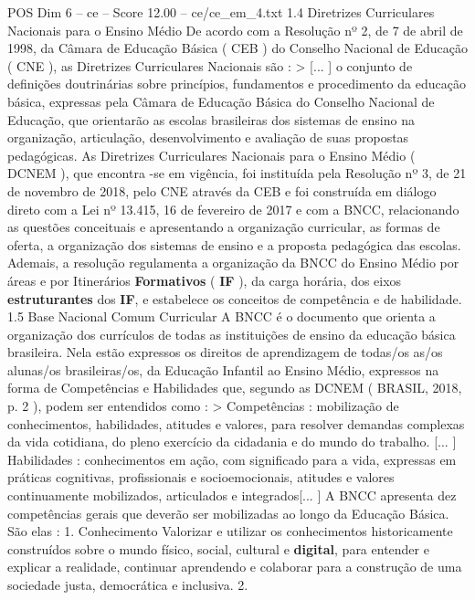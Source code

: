 \begin{textsample}{POS Dim 6 – ce – Score 12.00 – ce/ce\_em\_4.txt}  \label{ex:f6_pos_033}
1.4 Diretrizes Curriculares Nacionais para o Ensino Médio De acordo com a Resolução nº 2, de 7 de abril de 1998, da Câmara de Educação Básica ( CEB ) do Conselho Nacional de Educação ( CNE ), as Diretrizes Curriculares Nacionais são : > [... ] o conjunto de definições doutrinárias sobre princípios, fundamentos e procedimento da educação básica, expressas pela Câmara de Educação Básica do Conselho Nacional de Educação, que orientarão as escolas brasileiras dos sistemas de ensino na organização, articulação, desenvolvimento e avaliação de suas propostas pedagógicas.
As Diretrizes Curriculares Nacionais para o Ensino Médio ( DCNEM ), que encontra -se em vigência, foi instituída pela Resolução nº 3, de 21 de novembro de 2018, pelo CNE através da CEB e foi construída em diálogo direto com a Lei nº 13.415, 16 de fevereiro de 2017 e com a BNCC, relacionando as questões conceituais e apresentando a organização curricular, as formas de oferta, a organização dos sistemas de ensino e a proposta pedagógica das escolas.
Ademais, a resolução regulamenta a organização da BNCC do Ensino Médio por áreas e por Itinerários \textbf{Formativos} ( \textbf{IF} ), da carga horária, dos eixos \textbf{estruturantes} dos \textbf{IF}, e estabelece os conceitos de competência e de habilidade. 1.5 Base Nacional Comum Curricular A BNCC é o documento que orienta a organização dos currículos de todas as instituições de ensino da educação básica brasileira.
Nela estão expressos os direitos de aprendizagem de todas/os as/os alunas/os brasileiras/os, da Educação Infantil ao Ensino Médio, expressos na forma de Competências e Habilidades que, segundo as DCNEM ( BRASIL, 2018, p. 2 ), podem ser entendidos como : > Competências : mobilização de conhecimentos, habilidades, atitudes e valores, para resolver demandas complexas da vida cotidiana, do pleno exercício da cidadania e do mundo do trabalho. [... ] Habilidades : conhecimentos em ação, com significado para a vida, expressas em práticas cognitivas, profissionais e socioemocionais, atitudes e valores continuamente mobilizados, articulados e integrados[... ] A BNCC apresenta dez competências gerais que deverão ser mobilizadas ao longo da Educação Básica.
São elas : 1.
Conhecimento Valorizar e utilizar os conhecimentos historicamente construídos sobre o mundo físico, social, cultural e \textbf{digital}, para entender e explicar a realidade, continuar aprendendo e colaborar para a construção de uma sociedade justa, democrática e inclusiva. 2.

\end{textsample}

